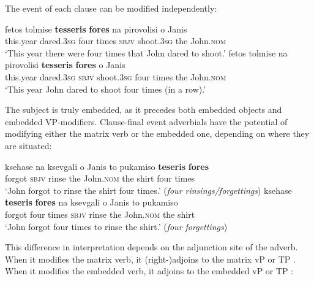 \documentclass[output=paper]{langsci/langscibook}
\begin{document}
The event of each clause can be modified independently:

\ea%
    \label{ex:alexiadou:8}
\ea \gll  fetos  tolmise     \textbf{tesseris}  \textbf{fores} na   pirovolisi  o    Janis\\
      this.year dared.\textsc{3sg}  four    times  \textsc{sbjv} shoot.\textsc{3sg}   the  John.\textsc{nom}\\
\glt  ‘This year there were four times that John dared to shoot.’ 
\ex
\gll fetos  tolmise  na    pirovolisi  \textbf{tesseris}  \textbf{fores} o    Janis\\
     this.year  dared.\textsc{3sg}  \textsc{sbjv} shoot.\textsc{3sg}   four  times  the  John.\textsc{nom}\\
\glt ‘This year John dared to shoot four times (in a row).’
\z
\z

The subject is truly embedded, as it precedes both embedded objects and embedded VP-modifiers. Clause-final event adverbials have the potential of modifying either the matrix verb or the embedded one, depending on where they are situated:



\ea%
    \label{ex:alexiadou:9}
\ea \gll  ksehase  na    ksevgali  o    Janis       to    pukamiso  \textbf{teseris}  \textbf{fores}\\
      forgot   \textsc{sbjv} rinse   the  John.\textsc{nom} the  shirt        four     times\\
  \glt    ‘John forgot to rinse the shirt four times.’ (\textit{four rinsings\slash forgettings})
\ex  \gll  ksehase  \textbf{teseris}  \textbf{fores} na  ksevgali  o    Janis      to  pukamiso\\
      forgot  four   times  \textsc{sbjv}  rinse  the  John.\textsc{nom} the  shirt\\
   \glt   ‘John forgot four times to rinse the shirt.’ (\textit{four forgettings})
   \z   
\z

This difference in interpretation depends on the adjunction site of the adverb. When it modifies the matrix verb, it (right-)adjoins to the matrix vP or TP . When it modifies the embedded verb, it adjoins to the embedded vP or TP :
\end{document}
